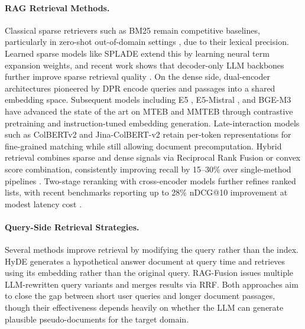 \documentclass[11pt]{article}
\begin{document}
\paragraph{RAG Retrieval Methods.}
Classical sparse retrievers such as BM25 remain competitive baselines, particularly in zero-shot out-of-domain settings \citep{thakur2021beir}, due to their lexical precision. Learned sparse models like SPLADE \citep{formal2021splade} extend this by learning neural term expansion weights, and recent work shows that decoder-only LLM backbones further improve sparse retrieval quality \citep{doshi2024mistralsplade}. On the dense side, dual-encoder architectures pioneered by DPR \citep{karpukhin2020dpr} encode queries and passages into a shared embedding space. Subsequent models including E5 \citep{wang2022e5}, E5-Mistral \citep{wang2024e5mistral}, and BGE-M3 \citep{chen2024bgem3} have advanced the state of the art on MTEB \citep{muennighoff2023mteb} and MMTEB \citep{enevoldsen2025mmteb} through contrastive pretraining and instruction-tuned embedding generation. Late-interaction models such as ColBERTv2 \citep{santhanam2022colbertv2} and Jina-ColBERT-v2 \citep{sturua2024jinacolbert} retain per-token representations for fine-grained matching while still allowing document precomputation. Hybrid retrieval combines sparse and dense signals via Reciprocal Rank Fusion \citep{cormack2009rrf} or convex score combination, consistently improving recall by 15--30\% over single-method pipelines \citep{li2025ragbestpractices}. Two-stage reranking with cross-encoder models further refines ranked lists, with recent benchmarks reporting up to 28\% nDCG@10 improvement at modest latency cost \citep{gao2024ragsurvey}.

\paragraph{Query-Side Retrieval Strategies.}
Several methods improve retrieval by modifying the query rather than the index. HyDE \citep{gao2022hyde} generates a hypothetical answer document at query time and retrieves using its embedding rather than the original query. RAG-Fusion \citep{raudaschl2023ragfusion} issues multiple LLM-rewritten query variants and merges results via RRF. Both approaches aim to close the gap between short user queries and longer document passages, though their effectiveness depends heavily on whether the LLM can generate plausible pseudo-documents for the target domain.
\end{document}
